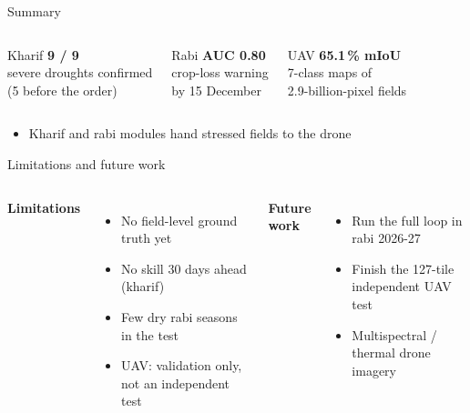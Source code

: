 \documentclass[aspectratio=169,11pt]{beamer}
\begin{document}
\begin{frame}{Summary}
  \begin{columns}[T]
    \begin{block}{Kharif}
      \centering
      {\Large\bfseries\color{amber}9 / 9}\\severe droughts confirmed\\(5 before the order)
    \end{block}
    \begin{block}{Rabi}
      \centering
      {\Large\bfseries\color{amber}AUC 0.80}\\crop-loss warning\\by 15 December
    \end{block}
    \begin{block}{UAV}
      \centering
      {\Large\bfseries\color{amber}65.1\,\% mIoU}\\7-class maps of\\2.9-billion-pixel fields
    \end{block}
  \end{columns}
  \vspace{10pt}
  \begin{itemize}
    \item Kharif and rabi modules \alert{hand stressed fields to the drone}
  \end{itemize}
\end{frame}

\begin{frame}{Limitations and future work}
  \begin{columns}[T]
    \textbf{Limitations}
    \begin{itemize}
      \item No field-level ground truth yet
      \item No skill 30 days ahead (kharif)
      \item Few dry rabi seasons in the test
      \item UAV: validation only, not an independent test
    \end{itemize}
    \textbf{Future work}
    \begin{itemize}
      \item Run the full loop in rabi 2026-27
      \item Finish the 127-tile independent UAV test
      \item Multispectral / thermal drone imagery
    \end{itemize}
  \end{columns}
\end{frame}
\end{document}
